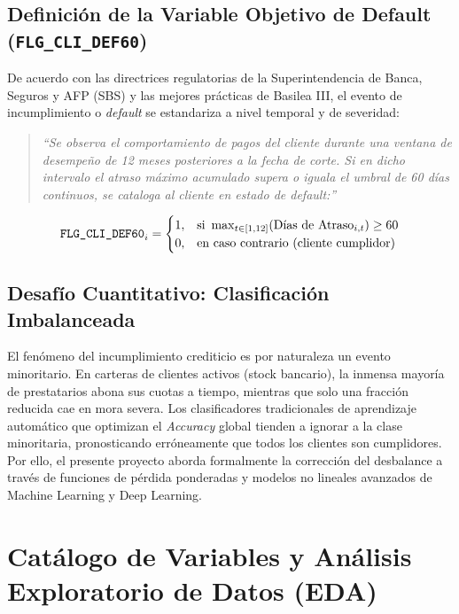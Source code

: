 \documentclass[11pt,a4paper]{article}
\begin{document}
\subsection{Definición de la Variable Objetivo de Default (\texttt{FLG\_CLI\_DEF60})}
De acuerdo con las directrices regulatorias de la Superintendencia de Banca, Seguros y AFP (SBS) y las mejores prácticas de Basilea III, el evento de incumplimiento o \textit{default} se estandariza a nivel temporal y de severidad:
\begin{quote}
\textit{``Se observa el comportamiento de pagos del cliente durante una ventana de desempeño de 12 meses posteriores a la fecha de corte. Si en dicho intervalo el atraso máximo acumulado supera o iguala el umbral de 60 días continuos, se cataloga al cliente en estado de default:''}
\end{quote}
\begin{equation}
\text{\texttt{FLG\_CLI\_DEF60}}_i = 
\begin{cases} 
1, & \text{si } \max_{t \in [1, 12]} (\text{Días de Atraso}_{i,t}) \ge 60 \\
0, & \text{en caso contrario (cliente cumplidor)}
\end{cases}
\end{equation}

\subsection{Desafío Cuantitativo: Clasificación Imbalanceada}
El fenómeno del incumplimiento crediticio es por naturaleza un evento minoritario. En carteras de clientes activos (stock bancario), la inmensa mayoría de prestatarios abona sus cuotas a tiempo, mientras que solo una fracción reducida cae en mora severa. Los clasificadores tradicionales de aprendizaje automático que optimizan el \textit{Accuracy} global tienden a ignorar a la clase minoritaria, pronosticando erróneamente que todos los clientes son cumplidores. Por ello, el presente proyecto aborda formalmente la corrección del desbalance a través de funciones de pérdida ponderadas y modelos no lineales avanzados de Machine Learning y Deep Learning.

\section{Catálogo de Variables y Análisis Exploratorio de Datos (EDA)}
\end{document}

